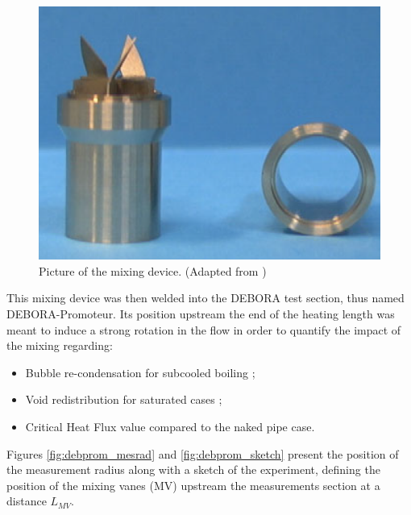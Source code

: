 \begin{figure}[!h]
\centering
\includegraphics[width=0.3\linewidth]{img/DEBORA-Promoteur/prom_pic2.png}
\caption{Picture of the mixing device. (Adapted from \cite{falk_promoteur_2007})}
\label{fig:debprom_vanes}
\end{figure}

\npar

This mixing device was then welded into the DEBORA test section, thus named DEBORA-Promoteur. Its position upstream the end of the heating length was meant to induce a strong rotation in the flow in order to quantify the impact of the mixing regarding:

\begin{itemize}
\item Bubble re-condensation for subcooled boiling ;
\item Void redistribution for saturated cases ;
\item Critical Heat Flux value compared to the naked pipe case.
\end{itemize}

Figures \ref{fig:debprom_mesrad} and \ref{fig:debprom_sketch} present the position of the measurement radius along with a sketch of the experiment, defining the position of the mixing vanes (MV) upstream the measurements section at a distance $L_{MV}$.




